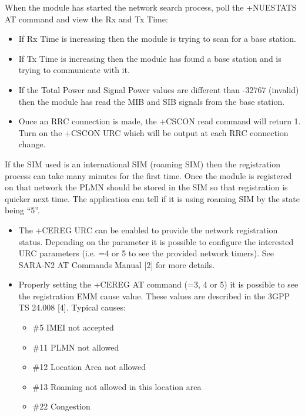 \documentclass[]{article}
\providecommand{\tightlist}{%
  \setlength{\itemsep}{0pt}\setlength{\parskip}{0pt}}
\begin{document}
When the module has started the network search process, poll the
+NUESTATS AT command and view the Rx and Tx Time:

\begin{itemize}
\tightlist
\item
  If Rx Time is increasing then the module is trying to scan for a base
  station.
\item
  If Tx Time is increasing then the module has found a base station and
  is trying to communicate with it.
\item
  If the Total Power and Signal Power values are different than -32767
  (invalid) then the module has read the MIB and SIB signals from the
  base station.
\item
  Once an RRC connection is made, the +CSCON read command will return 1.
  Turn on the +CSCON URC which will be output at each RRC connection
  change.
\end{itemize}

If the SIM used is an international SIM (roaming SIM) then the
registration process can take many minutes for the first time. Once the
module is registered on that network the PLMN should be stored in the
SIM so that registration is quicker next time. The application can tell
if it is using roaming SIM by the state being ``5''.

\begin{itemize}
\tightlist
\item
  The +CEREG URC can be enabled to provide the network registration
  status. Depending on the parameter it is possible to configure the
  interested URC parameters (i.e. =4 or 5 to see the provided network
  timers). See SARA-N2 AT Commands Manual {[}2{]} for more details.
\item
  Properly setting the +CEREG AT command (=3, 4 or 5) it is possible to
  see the registration EMM cause value. These values are described in
  the 3GPP TS 24.008 {[}4{]}. Typical causes:

  \begin{itemize}
  \tightlist
  \item
    \#5 IMEI not accepted
  \item
    \#11 PLMN not allowed
  \item
    \#12 Location Area not allowed
  \item
    \#13 Roaming not allowed in this location area
  \item
    \#22 Congestion
  \end{itemize}
\end{itemize}
\end{document}
